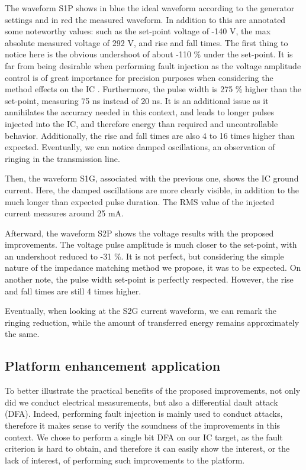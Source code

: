 		The waveform S1P shows in blue the ideal waveform according to the generator settings and in red the measured waveform.
		In addition to this are annotated some noteworthy values: such as the set-point voltage of -140 V, the max absolute measured voltage of 292 V, and rise and fall times.
		The first thing to notice here is the obvious undershoot of about -110 \% under the set-point.
		It is far from being desirable when performing fault injection as the voltage amplitude control is of great importance for precision purposes when considering the method effects on the IC \cite{mybbifdtc2023}.
		Furthermore, the pulse width is 275 \% higher than the set-point, measuring 75 ns instead of 20 ns.
		It is an additional issue as it annihilates the accuracy needed in this context, and leads to longer pulses injected into the IC, and therefore energy than required and uncontrollable behavior.
		Additionally, the rise and fall times are also 4 to 16 times higher than expected.
		Eventually, we can notice damped oscillations, an observation of ringing in the transmission line.

		Then, the waveform S1G, associated with the previous one, shows the IC ground current.
		Here, the damped oscillations are more clearly visible, in addition to the much longer than expected pulse duration.
		The RMS value of the injected current measures around 25 mA.

		Afterward, the waveform S2P shows the voltage results with the proposed improvements.
		The voltage pulse amplitude is much closer to the set-point, with an undershoot reduced to -31 \%.
		It is not perfect, but considering the simple nature of the impedance matching method we propose, it was to be expected.
		On another note, the pulse width set-point is perfectly respected.
		However, the rise and fall times are still 4 times higher.
		
		Eventually, when looking at the S2G current waveform, we can remark the ringing reduction, while the amount of transferred energy remains approximately the same.

	\subsection{Platform enhancement application}
		To better illustrate the practical benefits of the proposed improvements, not only did we conduct electrical measurements, but also a differential dault attack (DFA).
		Indeed, performing fault injection is mainly used to conduct attacks, therefore it makes sense to verify the soundness of the improvements in this context.
		We chose to perform a single bit DFA on our IC target, as the fault criterion is hard to obtain, and therefore it can easily show the interest, or the lack of interest, of performing such improvements to the platform.
		
